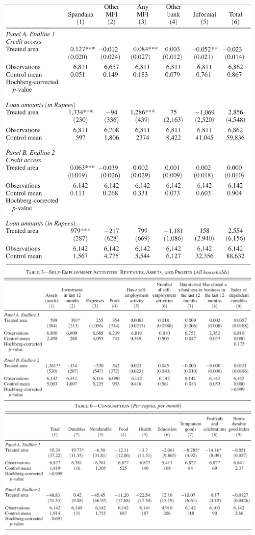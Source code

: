 \documentclass[
  letterpaper,
  DIV=11,
  numbers=noendperiod]{scrreprt}
\theoremstyle{definition}
\theoremstyle{remark}
\begin{document}
\includegraphics{Images/Banerjee_Regression_1.png}
\includegraphics{Images/Banerjee_Regression_3.png}
\includegraphics{Images/Banerjee_Regression_2.png}
\end{document}

